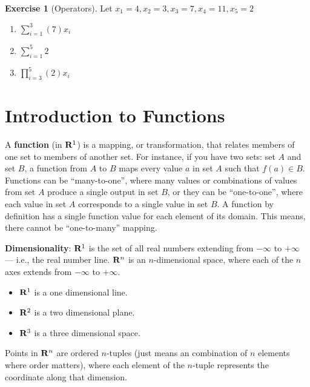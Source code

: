 \documentclass[
]{book}
\providecommand{\tightlist}{%
  \setlength{\itemsep}{0pt}\setlength{\parskip}{0pt}}
\theoremstyle{definition}
\theoremstyle{definition}
\theoremstyle{definition}
\newtheorem{exercise}{Exercise}[chapter]
\theoremstyle{definition}
\theoremstyle{remark}
\begin{document}
\begin{exercise}[Operators]
\protect\hypertarget{exr:operators1}{}{\label{exr:operators1} {} }Let \(x_1 = 4, x_2 = 3, x_3 = 7, x_4 = 11, x_5 = 2\)

\begin{enumerate}
\def\labelenumi{\arabic{enumi}.}
\item
  \(\sum\limits_{i=1}^{3} (7)x_i\)
\item
  \(\sum\limits_{i=1}^{5} 2\)
\item
  \(\prod\limits_{i=3}^{5} (2)x_i\)
\end{enumerate}
\end{exercise}

\hypertarget{introduction-to-functions}{%
\section{Introduction to Functions}\label{introduction-to-functions}}

A \textbf{function} (in \({\bf R}^1\)) is a mapping, or transformation, that relates members of one set to members of another set. For instance, if you have two sets: set \(A\) and set \(B\), a function from \(A\) to \(B\) maps every value \(a\) in set \(A\) such that \(f(a) \in B\). Functions can be ``many-to-one'', where many values or combinations of values from set \(A\) produce a single output in set \(B\), or they can be ``one-to-one'', where each value in set \(A\) corresponds to a single value in set \(B\). A function by definition has a single function value for each element of its domain. This means, there cannot be ``one-to-many'' mapping.

\textbf{Dimensionality}: \({\bf R}^1\) is the set of all real numbers extending from \(-\infty\) to \(+\infty\) --- i.e., the real number line. \({\bf R}^n\) is an \(n\)-dimensional space, where each of the \(n\) axes extends from \(-\infty\) to \(+\infty\).

\begin{itemize}
\tightlist
\item
  \({\bf R}^1\) is a one dimensional line.
\item
  \({\bf R}^2\) is a two dimensional plane.
\item
  \({\bf R}^3\) is a three dimensional space.
\end{itemize}

Points in \({\bf R}^n\) are ordered \(n\)-tuples (just means an combination of \(n\) elements where order matters), where each element of the \(n\)-tuple represents the coordinate along that dimension.
\end{document}
